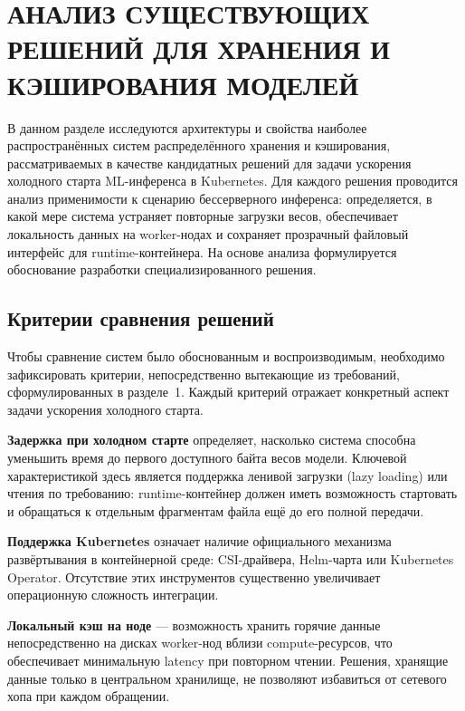 \section{АНАЛИЗ СУЩЕСТВУЮЩИХ РЕШЕНИЙ ДЛЯ ХРАНЕНИЯ И КЭШИРОВАНИЯ МОДЕЛЕЙ}

В данном разделе исследуются архитектуры и свойства наиболее распространённых систем распределённого хранения и кэширования, рассматриваемых в качестве кандидатных решений для задачи ускорения холодного старта ML-инференса в Kubernetes. Для каждого решения проводится анализ применимости к сценарию бессерверного инференса: определяется, в какой мере система устраняет повторные загрузки весов, обеспечивает локальность данных на worker-нодах и сохраняет прозрачный файловый интерфейс для runtime-контейнера. На основе анализа формулируется обоснование разработки специализированного решения.

\subsection{Критерии сравнения решений}
\label{sec:criteria}

Чтобы сравнение систем было обоснованным и воспроизводимым, необходимо зафиксировать критерии, непосредственно вытекающие из требований, сформулированных в разделе~1. Каждый критерий отражает конкретный аспект задачи ускорения холодного старта.

\textbf{Задержка при холодном старте} определяет, насколько система способна уменьшить время до первого доступного байта весов модели. Ключевой характеристикой здесь является поддержка ленивой загрузки (lazy loading) или чтения по требованию: runtime-контейнер должен иметь возможность стартовать и обращаться к отдельным фрагментам файла ещё до его полной передачи.

\textbf{Поддержка Kubernetes} означает наличие официального механизма развёртывания в контейнерной среде: CSI-драйвера, Helm-чарта или Kubernetes Operator. Отсутствие этих инструментов существенно увеличивает операционную сложность интеграции.

\textbf{Локальный кэш на ноде} — возможность хранить горячие данные непосредственно на дисках worker-нод вблизи compute-ресурсов, что обеспечивает минимальную latency при повторном чтении. Решения, хранящие данные только в центральном хранилище, не позволяют избавиться от сетевого хопа при каждом обращении.

